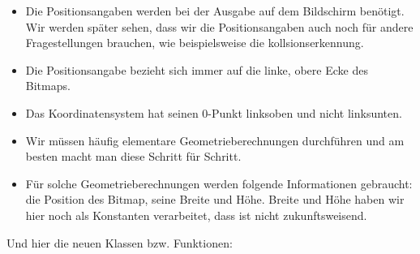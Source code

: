 \begin{itemize}
	\item Die Positionsangaben werden bei der Ausgabe auf dem Bildschirm benötigt. Wir werden später sehen, dass wir die Positionsangaben auch noch für andere Fragestellungen brauchen, wie beispielsweise die \Gls{kollsionserkennung}.
	
	\item Die Positionsangabe bezieht sich immer auf die linke, obere Ecke des Bitmaps. 
	
	\item Das Koordinatensystem hat seinen 0-Punkt linksoben und nicht linksunten.
	
	\item Wir müssen häufig elementare Geometrieberechnungen durchführen und am besten macht man diese Schritt für Schritt.
	
	\item Für solche Geometrieberechnungen werden folgende Informationen gebraucht: die Position des Bitmap, seine Breite und Höhe. Breite und Höhe haben wir hier noch als Konstanten verarbeitet, dass ist nicht zukunftsweisend.
\end{itemize}

Und hier die neuen Klassen bzw. Funktionen:

